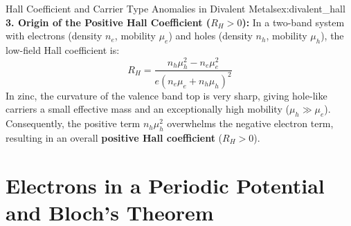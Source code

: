 \documentclass[11pt,a4paper]{article}
\begin{document}
\begin{examplebox}{Hall Coefficient and Carrier Type Anomalies in Divalent Metals}{ex:divalent_hall}
\textbf{3. Origin of the Positive Hall Coefficient ($R_H > 0$):}
In a two-band system with electrons (density $n_e$, mobility $\mu_e$) and holes (density $n_h$, mobility $\mu_h$), the low-field Hall coefficient is:
\[
R_H = \frac{n_h \mu_h^2 - n_e \mu_e^2}{e (n_e \mu_e + n_h \mu_h)^2}
\]
In zinc, the curvature of the valence band top is very sharp, giving hole-like carriers a small effective mass and an exceptionally high mobility ($\mu_h \gg \mu_e$). Consequently, the positive term $n_h \mu_h^2$ overwhelms the negative electron term, resulting in an overall \textbf{positive Hall coefficient} ($R_H > 0$).
\end{examplebox}

\clearpage


\section{Electrons in a Periodic Potential and Bloch's Theorem}
\label{sec:bloch_theorem}
\end{document}
